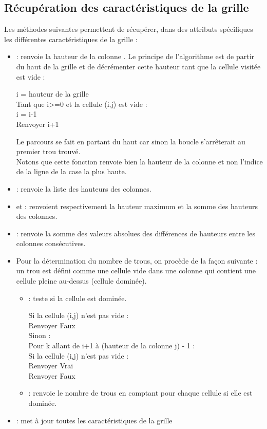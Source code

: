 \subsection{Récupération des caractéristiques de la grille}
Les méthodes suivantes permettent de récupérer, dans des attributs spécifiques les différentes caractéristiques de la grille :
\begin{itemize}
	\item {} : renvoie la hauteur de la colonne . Le principe de l'algorithme est de partir du haut de la grille et de décrémenter cette hauteur tant que la cellule visitée est vide :
	\begin{python}
		i = hauteur de la grille\\
		Tant que i>=0 et la cellule (i,j) est vide :\\
		i = i-1\\
		Renvoyer i+1 
	\end{python} 

	Le parcours se fait en partant du haut car sinon la boucle s'arrêterait au premier trou trouvé.\\
	Notons que cette fonction renvoie bien la hauteur de la colonne et non l'indice de la ligne de la case la plus haute.
	\item {} : renvoie la liste des hauteurs des colonnes.
	\item {} et  : renvoient respectivement la hauteur maximum et la somme des hauteurs des colonnes.
	\item {} : renvoie la somme des valeurs absolues des différences de hauteurs entre les colonnes consécutives.
	\item Pour la détermination du nombre de trous, on procède de la façon suivante : un trou est défini comme une cellule vide dans une colonne qui contient une cellule pleine au-dessus (cellule dominée).
		\begin{itemize}
			\item {} : teste si la cellule  est dominée.
			\begin{python}
				Si la cellule (i,j) n'est pas vide :\\
				Renvoyer Faux\\
				Sinon :\\
				Pour k allant de i+1 à (hauteur de la colonne j) - 1 :\\
				Si la cellule (i,j) n'est pas vide :\\
				Renvoyer Vrai\\
				Renvoyer Faux
			\end{python}
			\item {} : renvoie le nombre de trous en comptant pour chaque cellule si elle est dominée.
		\end{itemize}
	\item {} : met à jour toutes les caractéristiques de la grille
\end{itemize}

